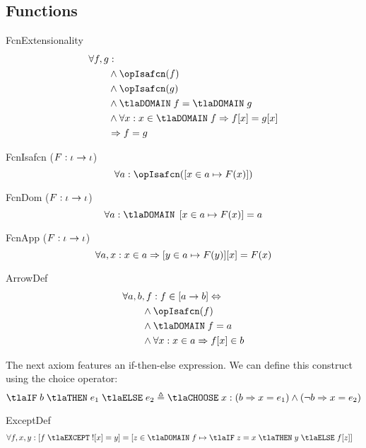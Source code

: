 \documentclass[11pt, a4paper, oneside]{article}
\begin{document}
    \subsection{Functions}
    \label{subsec:functions}

\begin{axioms}
\item[FcnExtensionality] \[
        \begin{aligned}
            &\forall f, g : \\
            &\qquad \wedge \opIsafcn(f) \\
            &\qquad \wedge \opIsafcn(g) \\
            &\qquad \wedge \tlaDOMAIN\; f = \tlaDOMAIN\; g \\
            &\qquad \wedge \forall x : x \in \tlaDOMAIN\; f \imp f\!\bx{x} = g\!\bx{x} \\
            &\qquad \imp f = g
        \end{aligned}
    \]

\item[FcnIsafcn ($F : \iota \rightarrow \iota$)] \[
        \forall a : \opIsafcn(\bx{ x \in a \mapsto F(x) })
    \]

\item[FcnDom ($F : \iota \rightarrow \iota$)] \[
        \forall a : \tlaDOMAIN\; \bx{ x \in a \mapsto F(x) } = a
    \]

\item[FcnApp ($F : \iota \rightarrow \iota$)] \[
        \forall a, x : x \in a \Rightarrow \left[  y \in a \mapsto F(y)  \right]\!\left[ x \right] = F(x)
    \]

\item[ArrowDef] \[
        \begin{aligned}
            &\forall a, b, f : f \in \bx{ a \arr b } \eqv \\
            &\qquad \wedge \opIsafcn(f) \\
            &\qquad \wedge \tlaDOMAIN\; f = a \\
            &\qquad \wedge \forall x : x \in a \imp f\!\bx{x} \in b
        \end{aligned}
    \]

\end{axioms}

The next axiom features an if-then-else expression.  We can define this construct using the choice operator: \[
    \tlaIF\; b \;\tlaTHEN\; e_1 \;\tlaELSE\; e_2 \triangleq \tlaCHOOSE\; x : (b \imp x = e_1) \wedge (\neg b \imp x = e_2)
\]

\begin{axioms}
\item[ExceptDef] \[
        \begin{aligned}
            &\forall f, x, y : \bx{ f \;\tlaEXCEPT\; !\!\bx{x} = y } = \bx{ z \in \tlaDOMAIN\; f \mapsto \tlaIF\; z = x \;\tlaTHEN\; y \;\tlaELSE\; f\!\bx{z} }
        \end{aligned}
    \]

\end{axioms}
\end{document}
